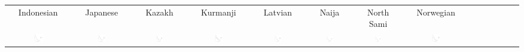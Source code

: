 \documentclass[11pt,letterpaper]{article}
\begin{document}
\begin{tabular}{cccccccccccccc}
\\
Indonesian & Japanese & Kazakh & Kurmanji & Latvian & Naija & North Sami & Norwegian \\
\includegraphics[width=0.14\textwidth]{figures/Indonesian-listener-surprisal-memory.pdf} & \includegraphics[width=0.14\textwidth]{figures/Japanese-listener-surprisal-memory.pdf} & \includegraphics[width=0.14\textwidth]{figures/Kazakh-Adap-listener-surprisal-memory.pdf} & \includegraphics[width=0.14\textwidth]{figures/Kurmanji-Adap-listener-surprisal-memory.pdf} & \includegraphics[width=0.14\textwidth]{figures/Latvian-listener-surprisal-memory.pdf} & \includegraphics[width=0.14\textwidth]{figures/Naija-Adap-listener-surprisal-memory.pdf} & \includegraphics[width=0.14\textwidth]{figures/North_Sami-listener-surprisal-memory.pdf} & \includegraphics[width=0.14\textwidth]{figures/Norwegian-listener-surprisal-memory.pdf}

\end{tabular}
\end{document}
